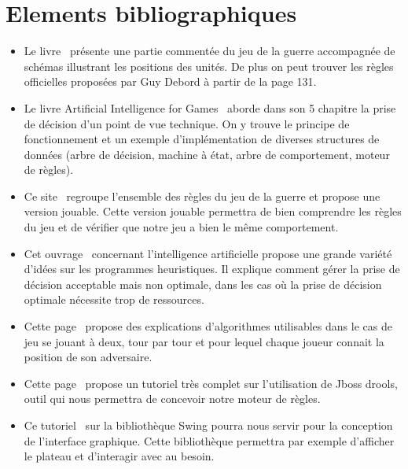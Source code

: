 \documentclass[12pt]{article}
\begin{document}
	\section{Elements bibliographiques}
	\begin{itemize}
	
		\item Le livre~\cite{ref1} présente une partie commentée du jeu de la guerre accompagnée de schémas illustrant les positions des unités. De plus on peut trouver les règles officielles proposées par Guy Debord à partir de la page 131.
		~~\\

		\item Le livre Artificial Intelligence for Games~\cite{ref2} aborde dans son 5 chapitre la prise de décision d'un point de vue technique. On y trouve le principe de fonctionnement et un exemple d'implémentation de diverses structures de données (arbre de décision, machine à état, arbre de comportement, moteur de règles).
		~~\\

		\item Ce site~\cite{ref3} regroupe l'ensemble des règles du jeu de la guerre et propose une version jouable. Cette version jouable permettra de bien comprendre les règles du jeu et de vérifier que notre jeu a bien le même comportement.
		~~\\

		\item Cet ouvrage~\cite{ref4} concernant l'intelligence artificielle propose une grande variété d'idées sur les programmes heuristiques. Il explique comment gérer la prise de décision acceptable mais non optimale, dans les cas où la prise de décision optimale nécessite trop de ressources.
		~~\\

		\item Cette page~\cite{ref5} propose des explications d'algorithmes utilisables dans le cas de jeu se jouant à deux, tour par tour et pour lequel chaque joueur connait la position de son adversaire.
		~~\\
		
		\item Cette page~\cite{ref6} propose un tutoriel très complet sur l'utilisation de Jboss drools, outil qui nous permettra de concevoir notre moteur de règles.
		~~\\
		
		\item Ce tutoriel~\cite{ref7} sur la bibliothèque Swing pourra nous servir pour la conception de l'interface graphique. Cette bibliothèque permettra par exemple d'afficher le plateau et d'interagir avec au besoin.
		~~\\

	\end{itemize}

	
	{}
\end{document}
